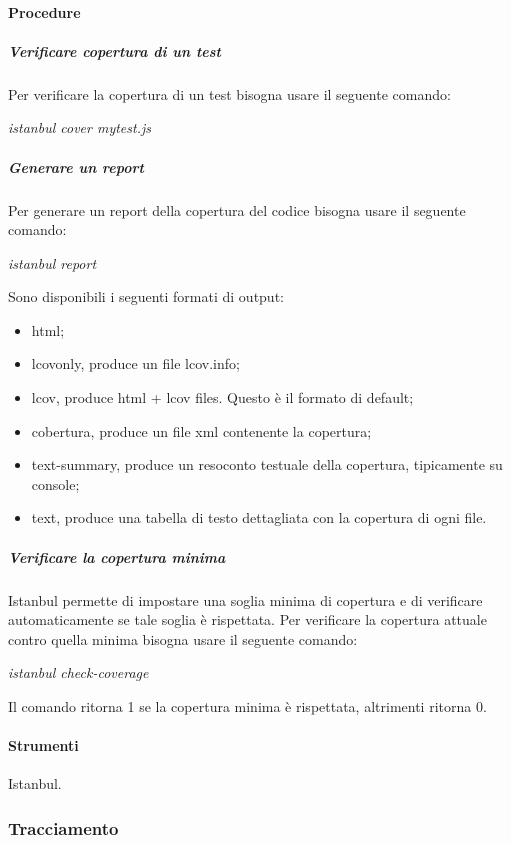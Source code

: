 \paragraph{Procedure}
\subparagraph{Verificare copertura di un test}
Per verificare la copertura di un test bisogna usare il seguente comando:\\
\begin{center}
\textit{istanbul cover mytest.js}\\
\end{center}

\subparagraph{Generare un report}
Per generare un report della copertura del codice bisogna usare il seguente comando:\\

\begin{center}
\textit{istanbul report}\\
\end{center}
Sono disponibili i seguenti formati di output:
\begin{itemize}
\item html;
\item lcovonly, produce un file lcov.info;
\item lcov, produce html + lcov files. Questo è il formato di default;
\item cobertura, produce un file xml contenente la copertura;
\item text-summary, produce un resoconto testuale della copertura, tipicamente su console;
\item text, produce una tabella di testo dettagliata con la copertura di ogni file.
\end{itemize}

\subparagraph{Verificare la copertura minima}
Istanbul permette di impostare una soglia minima di copertura e di verificare automaticamente se tale soglia è rispettata.
Per verificare la copertura attuale contro quella minima bisogna usare il seguente comando:\\
\begin{center}
\textit{istanbul check-coverage}\\
\end{center}
Il comando ritorna 1 se la copertura minima è rispettata, altrimenti ritorna 0.


\paragraph{Strumenti}
Istanbul.


\subsubsection{Tracciamento}

